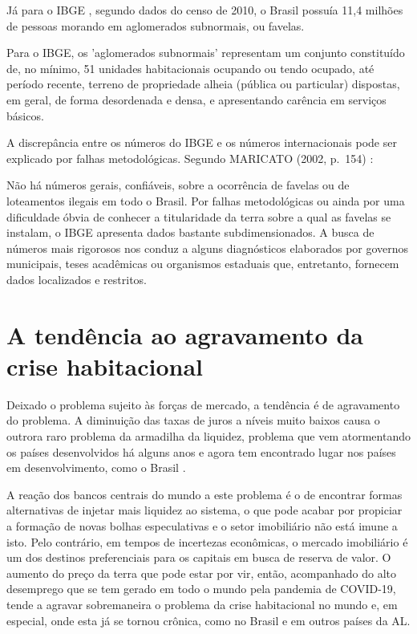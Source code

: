 \documentclass[
	12pt,				%
	oneside,			%
	a4paper,			%
	chapter=TITLE,		%
	section=TITLE,		%
	english,			%
	brazil				%
	]{abntex2}
\begin{document}
Já para o IBGE \autocite{ibge}, segundo dados do censo de 2010, o Brasil possuía 11,4
milhões de pessoas morando em aglomerados subnormais, ou favelas.
\begin{citacao}
Para o IBGE, os 'aglomerados subnormais' representam um conjunto constituído de,
no mínimo, 51 unidades habitacionais ocupando ou tendo ocupado, até período
recente, terreno de propriedade alheia (pública ou particular) dispostas, em
geral, de forma desordenada e densa, e apresentando carência em serviços
básicos.
\cite{ibge2}
\end{citacao}
A discrepância entre os números do IBGE e os números internacionais pode ser
explicado por falhas metodológicas. Segundo MARICATO (2002, p.~154) \autocite[\emph{apud}][9]{silva}:
\begin{citacao}
Não há números gerais, confiáveis, sobre a ocorrência de favelas ou de
loteamentos ilegais em todo o Brasil. Por falhas metodológicas ou ainda por uma
dificuldade óbvia de conhecer a titularidade da terra sobre a qual as favelas se
instalam, o IBGE apresenta dados bastante subdimensionados. A busca de números
mais rigorosos nos conduz a alguns diagnósticos elaborados por governos
municipais, teses acadêmicas ou organismos estaduais que, entretanto, fornecem
dados localizados e restritos.
\end{citacao}
\hypertarget{a-tenduxeancia-ao-agravamento-da-crise-habitacional}{%
\section{A tendência ao agravamento da crise habitacional}\label{a-tenduxeancia-ao-agravamento-da-crise-habitacional}}

Deixado o problema sujeito às forças de mercado, a tendência é de agravamento do
problema. A diminuição das taxas de juros a níveis muito baixos causa o
outrora raro problema da armadilha da liquidez, problema que vem atormentando os
países desenvolvidos há alguns anos e agora tem encontrado lugar nos países em
desenvolvimento, como o Brasil \autocite{krugman-emergentes}.

A reação dos bancos centrais do mundo a este problema é o de encontrar formas
alternativas de injetar mais liquidez ao sistema, o que pode acabar por
propiciar a formação de novas bolhas especulativas e o setor imobiliário não
está imune a isto. Pelo contrário, em tempos de incertezas econômicas, o
mercado imobiliário é um dos destinos preferenciais para os capitais em busca
de reserva de valor. O aumento do preço da terra que pode estar por vir, então,
acompanhado do alto desemprego que se tem gerado em todo o mundo pela pandemia
de COVID-19, tende a agravar sobremaneira o problema da crise habitacional no
mundo e, em especial, onde esta já se tornou crônica, como no Brasil e em outros
países da \gls{AL}.
\end{document}
